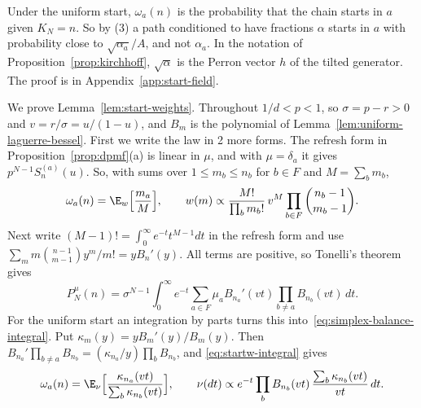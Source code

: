 Under the uniform start, $\omega_a(n)$ is the probability that the chain starts
in $a$ given $K_N=n$. So by (3) a path conditioned to have fractions $\alpha$
starts in $a$ with probability close to $\sqrt{\alpha_a}/A$, and not $\alpha_a$.
In the notation of Proposition~\ref{prop:kirchhoff}, $\sqrt\alpha$ is the Perron
vector $h$ of the tilted generator. The proof is in
Appendix~\ref{app:start-field}.

We prove Lemma~\ref{lem:start-weights}. Throughout $1/d<p<1$, so $\sigma=p-r>0$
and $v=r/\sigma=u/(1-u)$, and $B_m$ is the polynomial of
Lemma~\ref{lem:uniform-laguerre-bessel}. First we write the law in 2 more forms.
The refresh form in Proposition~\ref{prop:dpmf}(a) is linear in $\mu$, and with
$\mu=\delta_a$ it gives $p^{N-1}S^{(a)}_n(u)$. So, with sums over
$1\le m_b\le n_b$ for $b\in F$ and $M=\sum_bm_b$,
\begin{equation}\label{eq:startw-weights}
 \omega_a(n)=\E_w\Bigl[\frac{m_a}M\Bigr],\qquad
 w(m)\propto\frac{M!}{\prod_bm_b!}\,v^M\prod_{b\in F}\binom{n_b-1}{m_b-1}.
\end{equation}
Next write $(M-1)!=\int_0^\infty e^{-t}t^{M-1}dt$ in the refresh form and use
$\sum_m m\binom{n-1}{m-1}y^m/m!=yB_n'(y)$. All terms are positive, so Tonelli's
theorem gives
\begin{equation}\label{eq:startw-integral}
 P^\mu_N(n)=\sigma^{N-1}\int_0^\infty e^{-t}\sum_{a\in F}\mu_a
 B_{n_a}'(vt)\prod_{b\ne a}B_{n_b}(vt)\,dt.
\end{equation}
For the uniform start an integration by parts turns this
into~\eqref{eq:simplex-balance-integral}. Put $\kappa_m(y)=yB_m'(y)/B_m(y)$. Then
$B_{n_a}'\prod_{b\ne a}B_{n_b}=(\kappa_{n_a}/y)\prod_bB_{n_b}$, and
\eqref{eq:startw-integral} gives
\begin{equation}\label{eq:startw-nu}
 \omega_a(n)=\E_\nu\Bigl[\frac{\kappa_{n_a}(vt)}{\sum_b\kappa_{n_b}(vt)}\Bigr],
 \qquad
 \nu(dt)\propto e^{-t}\prod_bB_{n_b}(vt)\,\frac{\sum_b\kappa_{n_b}(vt)}{vt}\,dt.
\end{equation}

